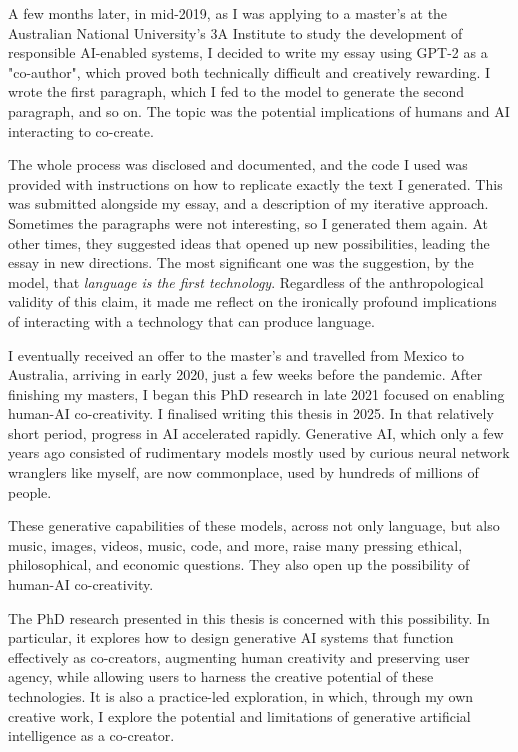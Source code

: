 A few months later, in mid-2019, as I was applying to a master’s at the Australian National University’s 3A Institute to study the development of responsible AI-enabled systems, I decided to write my essay using GPT-2 as a "co-author", which proved both technically difficult and creatively rewarding. I wrote the first paragraph, which I fed to the model to generate the second paragraph, and so on. The topic was the potential implications of humans and AI interacting to co-create.

The whole process was disclosed and documented, and the code I used was provided with instructions on how to replicate exactly the text I generated. This was submitted alongside my essay, and a description of my iterative approach. Sometimes the paragraphs were not interesting, so I generated them again. At other times, they suggested ideas that opened up new possibilities, leading the essay in new directions. The most significant one was the suggestion, by the model, that \textit{language is the first technology}. Regardless of the anthropological validity of this claim, it made me reflect on the ironically profound implications of interacting with a technology that can produce language.

I eventually received an offer to the master’s and travelled from Mexico to Australia, arriving in early 2020, just a few weeks before the pandemic. After finishing my masters, I began this PhD research in late 2021 focused on enabling human-AI co-creativity. I finalised writing this thesis in 2025. In that relatively short period, progress in AI accelerated rapidly. Generative AI, which only a few years ago consisted of rudimentary models mostly used by curious neural network wranglers like myself, are now commonplace, used by hundreds of millions of people.

These generative capabilities of these models, across not only language, but also music, images, videos, music, code, and more, raise many pressing ethical, philosophical, and economic questions. They also open up the possibility of human-AI co-creativity.

The PhD research presented in this thesis is concerned with this possibility. In particular, it explores how to design generative AI systems that function effectively as co-creators, augmenting human creativity and preserving user agency, while allowing users to harness the creative potential of these technologies. It is also a practice-led exploration, in which, through my own creative work, I explore the potential and limitations of generative artificial intelligence as a co-creator. 


